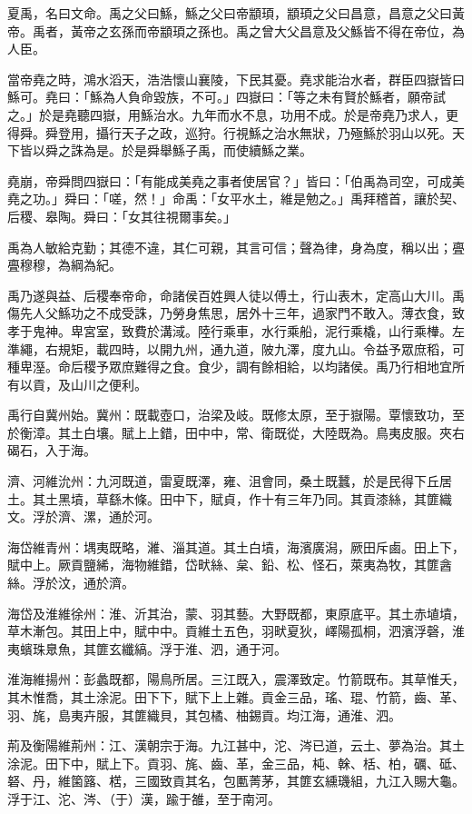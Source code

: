 
\begin{pinyinscope}
夏禹，名曰文命。禹之父曰鯀，鯀之父曰帝顓頊，顓頊之父曰昌意，昌意之父曰黃帝。禹者，黃帝之玄孫而帝顓頊之孫也。禹之曾大父昌意及父鯀皆不得在帝位，為人臣。

當帝堯之時，鴻水滔天，浩浩懷山襄陵，下民其憂。堯求能治水者，群臣四嶽皆曰鯀可。堯曰：「鯀為人負命毀族，不可。」四嶽曰：「等之未有賢於鯀者，願帝試之。」於是堯聽四嶽，用鯀治水。九年而水不息，功用不成。於是帝堯乃求人，更得舜。舜登用，攝行天子之政，巡狩。行視鯀之治水無狀，乃殛鯀於羽山以死。天下皆以舜之誅為是。於是舜舉鯀子禹，而使續鯀之業。

堯崩，帝舜問四嶽曰：「有能成美堯之事者使居官？」皆曰：「伯禹為司空，可成美堯之功。」舜曰：「嗟，然！」命禹：「女平水土，維是勉之。」禹拜稽首，讓於契、后稷、皋陶。舜曰：「女其往視爾事矣。」

禹為人敏給克勤；其德不違，其仁可親，其言可信；聲為律，身為度，稱以出；亹亹穆穆，為綱為紀。

禹乃遂與益、后稷奉帝命，命諸侯百姓興人徒以傅土，行山表木，定高山大川。禹傷先人父鯀功之不成受誅，乃勞身焦思，居外十三年，過家門不敢入。薄衣食，致孝于鬼神。卑宮室，致費於溝淢。陸行乘車，水行乘船，泥行乘橇，山行乘檋。左準繩，右規矩，載四時，以開九州，通九道，陂九澤，度九山。令益予眾庶稻，可種卑溼。命后稷予眾庶難得之食。食少，調有餘相給，以均諸侯。禹乃行相地宜所有以貢，及山川之便利。

禹行自冀州始。冀州：既載壺口，治梁及岐。既修太原，至于嶽陽。覃懷致功，至於衡漳。其土白壤。賦上上錯，田中中，常、衛既從，大陸既為。鳥夷皮服。夾右碣石，入于海。

濟、河維沇州：九河既道，雷夏既澤，雍、沮會同，桑土既蠶，於是民得下丘居土。其土黑墳，草繇木條。田中下，賦貞，作十有三年乃同。其貢漆絲，其篚織文。浮於濟、漯，通於河。

海岱維青州：堣夷既略，濰、淄其道。其土白墳，海濱廣潟，厥田斥鹵。田上下，賦中上。厥貢鹽絺，海物維錯，岱畎絲、枲、鉛、松、怪石，萊夷為牧，其篚酓絲。浮於汶，通於濟。

海岱及淮維徐州：淮、沂其治，蒙、羽其藝。大野既都，東原底平。其土赤埴墳，草木漸包。其田上中，賦中中。貢維土五色，羽畎夏狄，嶧陽孤桐，泗濱浮磬，淮夷蠙珠臮魚，其篚玄纖縞。浮于淮、泗，通于河。

淮海維揚州：彭蠡既都，陽鳥所居。三江既入，震澤致定。竹箭既布。其草惟夭，其木惟喬，其土涂泥。田下下，賦下上上雜。貢金三品，瑤、琨、竹箭，齒、革、羽、旄，島夷卉服，其篚織貝，其包橘、柚錫貢。均江海，通淮、泗。

荊及衡陽維荊州：江、漢朝宗于海。九江甚中，沱、涔已道，云土、夢為治。其土涂泥。田下中，賦上下。貢羽、旄、齒、革，金三品，杶、榦、栝、柏，礪、砥、砮、丹，維箘簬、楛，三國致貢其名，包匭菁茅，其篚玄纁璣組，九江入賜大龜。浮于江、沱、涔、（于）漢，踰于雒，至于南河。


\end{pinyinscope}
